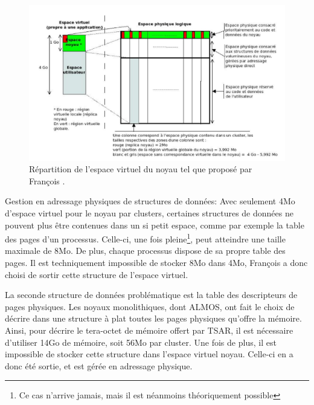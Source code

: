       \begin{figure}[ht]
        \centering \includegraphics[scale=0.3]{include/img/almos-guerret}
        \caption{Répartition de l'espace virtuel du noyau tel que proposé par
          François \citet{guerret2014exploitation}.}
        \label{fig:almos-guerret}
      \end{figure}

      \begin{paragraph}{Gestion en adressage physiques de structures de données:}
        Avec seulement 4Mo d'espace virtuel pour le noyau par clusters,
        certaines structures de données ne pouvent plus être contenues dans un
        si petit espace, comme par exemple la table des pages d'un
        processus. Celle-ci, une fois pleine\footnote{Ce cas n'arrive jamais,
          mais il est néanmoins théoriquement possible}, peut atteindre une
        taille maximale de 8Mo. De plus, chaque processus dispose de sa propre
        table des pages. Il est techniquement impossible de stocker 8Mo dans
        4Mo, François a donc choisi de sortir cette structure de l'espace
        virtuel.

        La seconde structure de données problématique est la table des
        descripteurs de pages physiques. Les noyaux monolithiques, dont ALMOS,
        ont fait le choix de décrire dans une structure à plat toutes les pages
        physiques qu'offre la mémoire. Ainsi, pour décrire le tera-octet de
        mémoire offert par TSAR, il est nécessaire d'utiliser 14Go de mémoire,
        soit 56Mo par cluster. Une fois de plus, il est impossible de stocker
        cette structure dans l'espace virtuel noyau. Celle-ci en a donc été
        sortie, et est gérée en adressage physique.
      \end{paragraph}


